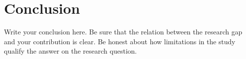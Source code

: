 \section{Conclusion}
\label{sec:conclusion}
Write your conclusion here. Be sure that the relation between the research gap and your contribution is clear. Be honest about how limitations in the study qualify the answer on the research question.
